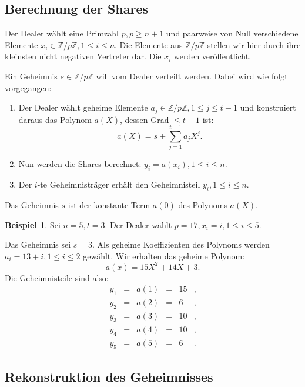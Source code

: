 \documentclass[12pt, a4paper, oneside, titlepage]{report}
\newcommand{\Z}{\mathds{Z}}
\theoremstyle{definition}
\newtheorem{bsp}[lemma]{Beispiel}
\begin{document}
	\subsection{Berechnung der Shares}
	
	Der Dealer wählt eine Primzahl $ p, p \geq n + 1 $ und paarweise von Null verschiedene Elemente $ x_i \in \Z / p \Z, 1 \leq i \leq n $. Die Elemente aus $ \Z / p \Z $ stellen wir hier durch ihre kleinsten nicht negativen Vertreter dar. Die $ x_i $ werden veröffentlicht.
	
	Ein Geheimnis $ s \in \Z / p \Z $ will vom Dealer verteilt werden. Dabei wird wie folgt vorgegangen:
	
	\begin{enumerate}
		\item {
			Der Dealer wählt geheime Elemente $ a_j \in \Z / p \Z, 1 \leq j \leq t - 1 $ und konstruiert daraus das Polynom $ a(X) $, dessen Grad $ \leq t-1 $ ist:
			\begin{equation}\label{secret-polynom-to-reconstruct}
			a(X) = s + \sum_{j=1}^{t-1} a_jX^j.
			\end{equation}
		}
		\item {
			Nun werden die Shares berechnet: $ y_i = a(x_i), 1 \leq i \leq n $.
		}
		\item {
			Der $ i $-te Geheimnisträger erhält den Geheimnisteil $ y_i, 1 \leq i \leq n $.
		}
	\end{enumerate}
	Das Geheimnis $ s $ ist der konstante Term $ a(0) $ des Polynoms $ a(X) $.
	\begin{bsp}\label{shares-example}
		Sei $ n = 5, t = 3 $. Der Dealer wählt $ p = 17, x_i = i, 1 \leq i \leq 5 $.
		
		Das Geheimnis sei $ s = 3 $. Als geheime Koeffizienten des Polynoms werden $ a_i = 13 + i, 1 \leq i \leq 2 $ gewählt. Wir erhalten das geheime Polynom:
		$$ a(x) = 15 X^2 + 14X + 3. $$
		Die Geheimnisteile sind also:
		$$\begin{array}{cccccc}
			y_1 & = & a(1) & = & 15 & , \\
			y_2 & = & a(2) & = & 6 & , \\
			y_3 & = & a(3) & = & 10 & , \\
			y_4 & = & a(4) & = & 10 & , \\
			y_5 & = & a(5) & = & 6 & .
		\end{array}$$
	\end{bsp}
	
	\subsection{Rekonstruktion des Geheimnisses}
	
\end{document}
